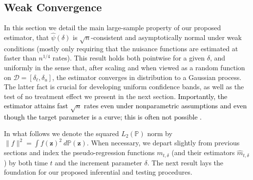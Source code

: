 \documentclass[12pt]{article}
\newcommand{\Pb}{\mathbb{P}}
\newcommand{\bz}{\mathbf{z}}
\theoremstyle{remark}
\begin{document}
\subsection{Weak Convergence}
\label{sec:clt}

In this section we detail the main large-sample property of our proposed estimator, that $\hat\psi(\delta)$ is $\sqrt{n}$-consistent and asymptotically normal under weak conditions (mostly only requiring that the nuisance functions are estimated at faster than $n^{1/4}$ rates). This result holds both pointwise for a given $\delta$, and uniformly in the sense that, after scaling and when viewed as a random function on $\mathcal{D}=[\delta_\ell,\delta_u]$, the estimator converges in distribution to a Gaussian process. The latter fact is crucial for developing uniform confidence bands, as well as the test of no treatment effect we present in the next section. \textcolor{black}{Importantly, the estimator attains fast $\sqrt{n}$ rates even under nonparametric assumptions and even though the target parameter is a curve; this is often not possible \autocite{kennedy2016robust, kennedy2017nonparametric}. }

In what follows we denote the squared $L_2(\Pb)$ norm by $\|f\|^2 = {\int f(\bz)^2 \ d\Pb(\bz)}$. When necessary, we depart slightly from previous sections and index the pseudo-regression functions $m_{t,\delta}$ (and their estimators $\hat{m}_{t,\delta}$) by both time $t$ and the increment parameter $\delta$. The next result lays the foundation for our proposed inferential and testing procedures.
\end{document}
